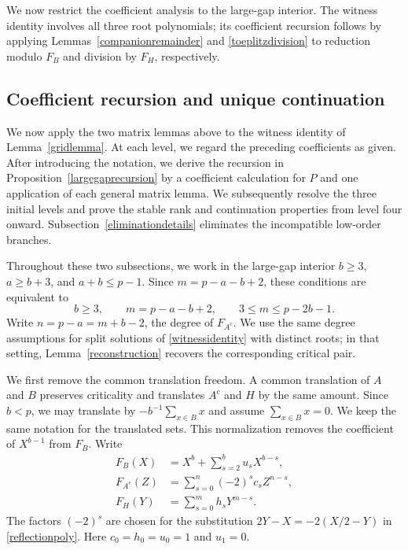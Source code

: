 \documentclass[10pt,a4paper]{amsart}
\begin{document}
We now restrict the coefficient analysis to the large-gap interior.
The witness identity involves all three root polynomials; its coefficient
recursion follows by applying Lemmas~\ref{companionremainder} and
\ref{toeplitzdivision} to reduction modulo $F_B$ and division by $F_H$,
respectively.

\subsection{Coefficient recursion and unique continuation}
\label{recurrence}

We now apply the two matrix lemmas above to the witness identity of
Lemma~\ref{gridlemma}.  At each level, we regard the preceding coefficients as given.
After introducing the notation, we derive the recursion in
Proposition~\ref{largegaprecursion} by a coefficient calculation for $P$
and one application of each general matrix lemma.  We subsequently resolve
the three initial levels and prove the stable rank and continuation
properties from level four onward.  Subsection~\ref{eliminationdetails}
eliminates the incompatible low-order branches.

Throughout these two subsections, we work in the large-gap interior
$b\ge3$, $a\ge b+3$, and $a+b\le p-1$.  Since $m=p-a-b+2$, these
conditions are equivalent to
\begin{equation}\label{rangealllarge}
 b\ge3,\qquad m=p-a-b+2,\qquad
 3\le m\le p-2b-1.
\end{equation}
Write $n=p-a=m+b-2$, the degree of $F_{A^c}$.
We use the same degree assumptions for split solutions of
\eqref{witnessidentity} with distinct roots; in that setting,
Lemma~\ref{reconstruction} recovers the corresponding critical pair.

We first remove the common translation freedom.  A common
translation of $A$ and $B$ preserves criticality and translates
$A^c$ and $H$ by the same amount.  Since $b<p$, we may translate by
$-b^{-1}\sum_{x\in B}x$ and assume $\sum_{x\in B}x=0$.  We keep the
same notation for the translated sets.
This normalization removes the coefficient of $X^{b-1}$ from $F_B$.
Write
\begin{equation}\label{rootpolys}
\begin{aligned}
 F_B(X)&=X^b+\sum_{s=2}^{b}u_sX^{b-s},\\
 F_{A^c}(Z)&=\sum_{s=0}^{n}(-2)^sc_sZ^{n-s},\\
 F_H(Y)&=\sum_{s=0}^{m}h_sY^{m-s}.
\end{aligned}
\end{equation}
The factors $(-2)^s$ are chosen for the substitution
$2Y-X=-2(X/2-Y)$ in \eqref{reflectionpoly}.
Here $c_0=h_0=u_0=1$ and $u_1=0$.
\end{document}
